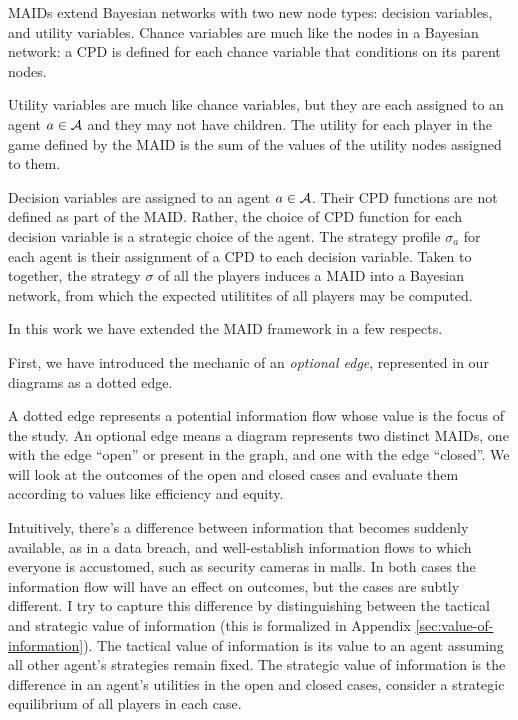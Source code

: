 \documentclass[../thesis.tex]{subfiles}
\begin{document}
MAIDs extend Bayesian networks with two new node types:
decision variables, and utility variables.
Chance variables are much like the nodes in a Bayesian
network: a CPD is defined for each chance variable
that conditions on its parent nodes.

Utility variables are much like chance variables,
but they are each assigned to an agent $a \in \mathcal{A}$
and they may not have children.
The utility for each player in the game defined by
the MAID is the sum of the values of the utility
nodes assigned to them.

Decision variables are assigned to an agent $a \in \mathcal{A}$.
Their CPD functions are not defined as part of the MAID.
Rather, the choice of CPD function for each decision variable
is a strategic choice of the agent. The strategy profile $\sigma_a$
for each agent is their assignment of a CPD to each decision variable.
Taken to together, the strategy $\sigma$ of all the players
induces a MAID into a Bayesian network, from which the
expected utilitites of all players may be computed.

In this work we have extended the MAID framework in a few
respects.

First, we have introduced the mechanic of an \emph{optional edge},
represented in our diagrams as a dotted edge.

\begin{center}
\end{center}

A dotted edge represents a potential information flow
whose value is the focus of the study.
An optional edge means a diagram represents two
distinct MAIDs, one with the edge ``open'' or present
in the graph, and one with the edge ``closed''.
We will look at the outcomes of the open and closed
cases and evaluate them
according to values like efficiency and equity.

Intuitively, there's a difference between information that
becomes suddenly available, as in a data breach, and
well-establish information flows to which everyone is
accustomed, such as security cameras in malls.
In both cases the information flow will have an effect on
outcomes, but the cases are subtly different.
I try to capture this difference by distinguishing between the
tactical and strategic
value of information (this is formalized in Appendix
\ref{sec:value-of-information}).
The tactical value of information is its value to an agent
assuming all other agent's strategies remain fixed.
The strategic value of information is the difference
in an agent's utilities in the open and closed cases,
consider a strategic equilibrium of all players in each case.
\end{document}
